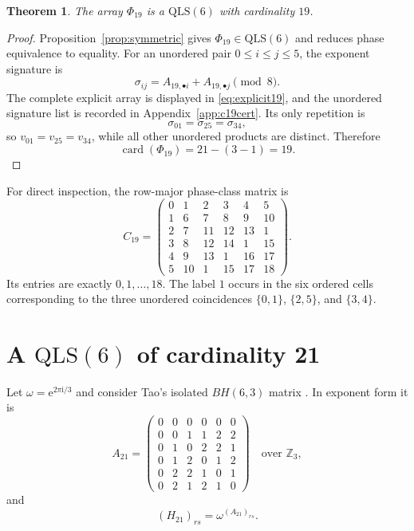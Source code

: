 \documentclass[11pt,a4paper]{article}
\newcommand{\Z}{\mathbb{Z}}
\newcommand{\QLS}{\mathrm{QLS}}
\newcommand{\card}{\operatorname{card}}
\newcommand{\ii}{\mathrm{i}}
\newcommand{\e}{\mathrm{e}}
\newtheorem{theorem}{Theorem}
\begin{document}
\begin{theorem}\label{thm:c19}
The array $\Phi_{19}$ is a $\QLS(6)$ with cardinality $19$.
\end{theorem}

\begin{proof}
Proposition~\ref{prop:symmetric} gives $\Phi_{19}\in\QLS(6)$ and reduces
phase equivalence to equality.  For an unordered pair $0\leq i\leq j\leq5$,
the exponent signature is
\begin{equation}\label{eq:signature19}
  \sigma_{ij}=A_{19,\bullet i}+A_{19,\bullet j}\pmod8.
\end{equation}
The complete explicit array is displayed in \eqref{eq:explicit19}, and the
unordered signature list is recorded in Appendix~\ref{app:c19cert}.  Its only
repetition is
\[
  \sigma_{01}=\sigma_{25}=\sigma_{34},
\]
so $v_{01}=v_{25}=v_{34}$, while all other unordered products are distinct.
Therefore
\[
  \card(\Phi_{19})=21-(3-1)=19.
\]
\end{proof}

For direct inspection, the row-major phase-class matrix is
\begin{equation}\label{eq:class19}
C_{19}=
\begin{pmatrix}
0&1&2&3&4&5\\
1&6&7&8&9&10\\
2&7&11&12&13&1\\
3&8&12&14&1&15\\
4&9&13&1&16&17\\
5&10&1&15&17&18
\end{pmatrix}.
\end{equation}
Its entries are exactly $0,1,\ldots,18$.  The label $1$ occurs in the six
ordered cells corresponding to the three unordered coincidences
$\{0,1\}$, $\{2,5\}$, and $\{3,4\}$.

\section{A \texorpdfstring{$\QLS(6)$}{QLS(6)} of cardinality 21}\label{sec:c21}

Let $\omega=\e^{2\pi\ii/3}$ and consider Tao's isolated $BH(6,3)$ matrix
\cite{TadejZyczkowski2006,Szollosi2012}.  In exponent form it is
\begin{equation}\label{eq:A21}
A_{21}=
\begin{pmatrix}
0&0&0&0&0&0\\
0&0&1&1&2&2\\
0&1&0&2&2&1\\
0&1&2&0&1&2\\
0&2&2&1&0&1\\
0&2&1&2&1&0
\end{pmatrix}
\quad\text{over }\Z_3,
\end{equation}
and
\begin{equation}\label{eq:H21}
  (H_{21})_{rs}=\omega^{(A_{21})_{rs}}.
\end{equation}
\end{document}
